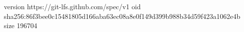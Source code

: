 version https://git-lfs.github.com/spec/v1
oid sha256:86f3bee0c15481805d166aba63ec08a8e0f149d399b988b34d59f423a1062e4b
size 196704
